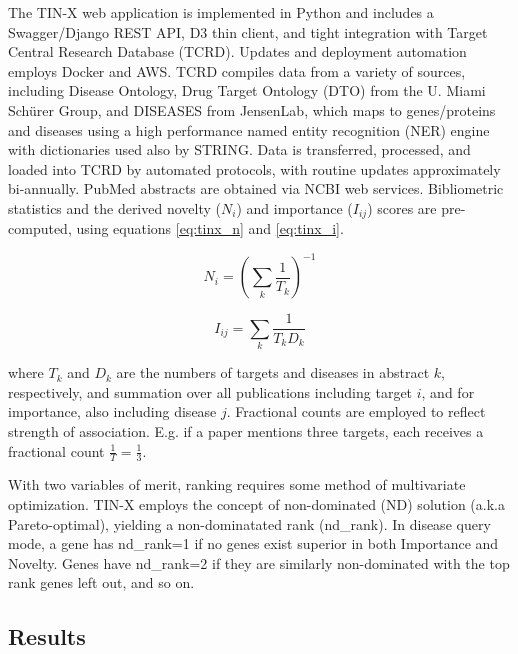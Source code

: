 The TIN-X web application is implemented in Python and includes a Swagger/Django REST API, D3 thin client, and tight integration with Target Central Research Database (TCRD)\cite{Nguyen2017-lo}. Updates and deployment automation employs Docker and AWS. TCRD compiles data from a variety of sources, including Disease Ontology\cite{Kibbe2015-li}, Drug Target Ontology (DTO)\cite{Vempati2012-ns} from the U. Miami Sch\"urer Group, and DISEASES\cite{Pletscher-Frankild2015-oo} from JensenLab, which maps to genes/proteins and diseases using a high performance named entity recognition (NER) engine\cite{Pafilis2013-ml} with dictionaries used also by STRING\cite{Szklarczyk2015-bl}.  Data is transferred, processed, and loaded into TCRD by automated protocols, with routine updates approximately bi-annually.  PubMed abstracts are obtained via NCBI web services.  Bibliometric statistics and the derived novelty ($N_i$) and importance ($I_{ij}$) scores are pre-computed, using equations \ref{eq:tinx_n} and \ref{eq:tinx_i}.

\begin{equation}
N_i = (\sum_{k}^{}\frac{1}{T_k})^{-1}
\label{eq:tinx_n}
\end{equation}

\begin{equation}
I_{ij} = \sum_{k}^{}\frac{1}{T_kD_k}
\label{eq:tinx_i}
\end{equation}

where $T_k$ and $D_k$ are the numbers of targets and diseases in abstract $k$, respectively, and summation over all publications including target $i$, and for importance, also including disease $j$. Fractional counts are employed to reflect strength of association.  E.g. if a paper mentions three targets, each receives a fractional count $\frac{1}{T} = \frac{1}{3}$.

With two variables of merit, ranking requires some method of multivariate optimization. TIN-X employs the concept of non-dominated (ND) solution (a.k.a Pareto-optimal), yielding a non-dominatated rank (nd\_rank). In disease query mode, a gene has nd\_rank=1 if no genes exist superior in both Importance and Novelty. Genes have nd\_rank=2 if they are similarly non-dominated with the top rank genes left out, and so on. 

\subsection{Results}

